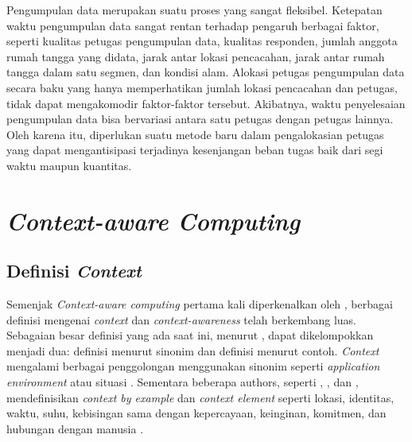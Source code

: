 Pengumpulan data merupakan suatu proses yang sangat fleksibel. Ketepatan waktu pengumpulan data sangat rentan terhadap pengaruh berbagai faktor, seperti kualitas petugas pengumpulan data, kualitas responden, jumlah anggota rumah tangga yang didata, jarak antar lokasi pencacahan, jarak antar rumah tangga dalam satu segmen, dan kondisi alam. Alokasi petugas pengumpulan data secara baku yang hanya memperhatikan jumlah lokasi pencacahan dan petugas, tidak dapat mengakomodir faktor-faktor tersebut. Akibatnya, waktu penyelesaian pengumpulan data bisa bervariasi antara satu petugas dengan petugas lainnya. Oleh karena itu, diperlukan suatu metode baru dalam pengalokasian petugas yang dapat mengantisipasi terjadinya kesenjangan beban tugas baik dari segi waktu maupun kuantitas.  

\section{\textit{Context-aware Computing}}
\label{sec:context-aware-computing}


\subsection{Definisi \textit{Context}}
\label{ssec:context-definition}
Semenjak \textit{Context-aware computing} pertama kali diperkenalkan oleh \citep{schilit_context-aware_1994}, berbagai definisi mengenai \textit{context} dan \textit{context-awareness} telah berkembang luas. Sebagaian besar definisi yang ada saat ini, menurut \citep{zimmermann_operational_2007}, dapat dikelompokkan menjadi dua: definisi menurut sinonim dan definisi menurut contoh. \textit{Context} mengalami berbagai penggolongan menggunakan sinonim seperti \textit{application environment} \citep{hull_towards_1997} atau situasi \citep{brown_stick-e_1995}. Sementara beberapa authors, seperti \citep{brown_context-aware_1997}, \citep{gross_awareness_2001}, dan \citep{ryan_enhanced_1999}, mendefinisikan \textit{context by example} dan \textit{context element} seperti lokasi, identitas, waktu, suhu, kebisingan sama dengan kepercayaan, keinginan, komitmen, dan hubungan dengan manusia \citep{chen_intelligent_2003}.


